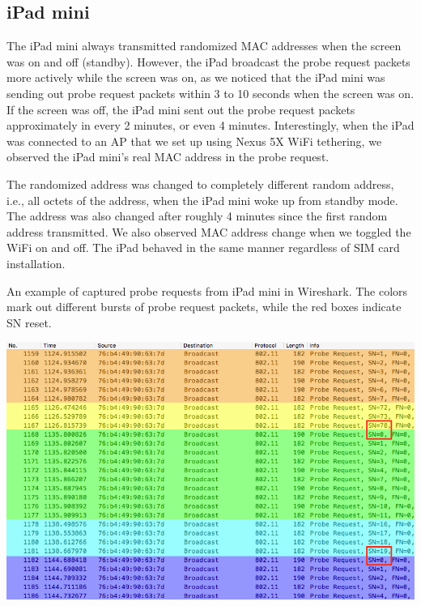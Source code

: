 	\subsection{iPad mini} %
	\label{sub:ipad_mini}
	The iPad mini always transmitted randomized \ac{MAC} addresses when the screen was on and off (standby). However, the iPad broadcast the probe request packets more actively while the screen was on, as we noticed that the iPad mini was sending out probe request packets within 3 to 10 seconds when the screen was on. If the screen was off, the iPad mini sent out the probe request packets approximately in every 2 minutes, or even 4 minutes. Interestingly, when the iPad was connected to an \ac{AP} that we set up using Nexus 5X WiFi tethering, we observed the iPad mini's real \ac{MAC} address in the probe request.

	The randomized address was changed to completely different random address, i.e., all octets of the address, when the iPad mini woke up from standby mode. The address was also changed after roughly 4 minutes since the first random address transmitted. We also observed \ac{MAC} address change when we toggled the WiFi on and off. The iPad behaved in the same manner regardless of \ac{SIM} card installation. 

	\begin{table}[h]
		\caption[Some examples of captured probe requests from iPad mini.]{An example of captured probe requests from iPad mini in Wireshark. The colors mark out different bursts of probe request packets, while the red boxes indicate \ac{SN} reset.}
		\label{fig:ipad-random}
		\centering
		\includegraphics[width=\textwidth]{./img/result/randomization/ipad-mini}
	\end{table}

